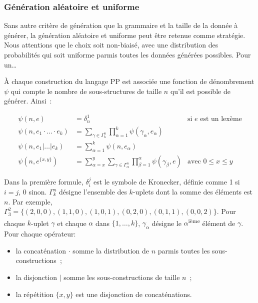 \subsubsection{Génération aléatoire et uniforme}
\label{subsection:data:random_uniform_generation}

Sans autre critère de génération que la grammaire et la taille de la donnée à
générer, la génération aléatoire et uniforme peut être retenue comme stratégie.
Nous attentions que le choix soit non-biaisé, avec une distribution des
probabilités qui soit uniforme parmis toutes les données générées possibles.
Pour un…

À chaque construction du langage PP est associée une fonction de dénombrement
$\psi$ qui compte le nombre de sous-structures de taille $n$ qu'il est possible
de générer. Ainsi~:

\begin{align*}
%
\psi(n, e) & =
    \delta_n^1
    &
    \text{si $e$ est un lexème}
    \\
%
\psi(n, e_1 \cdot \dotso \cdot e_k) & =
    \sum_{\gamma \in \Gamma_k^n}
    \prod_{\alpha = 1}^k
    \psi(\gamma_\alpha, e_\alpha)
    \\
%
\psi(n, e_1 \vert \dots \vert e_k) & =
    \sum_{\alpha = 1}^k
    \psi(n, e_\alpha)
    \\
%
\psi(n, e^{\{x, y\}}) & =
    \sum_{\alpha = x}^y
    \sum_{\gamma \in \Gamma_\alpha^n}
    \prod_{\beta = 1}^\alpha
    \psi(\gamma_\beta, e)
    &
    \text{avec $0 \leq x \leq y$}
%
\end{align*}

Dans la première formule, $\delta_i^j$ est le symbole de Kronecker, définie
comme 1 si $i = j$, 0 sinon. $\Gamma_k^n$ désigne l'ensemble des $k$-uplets dont
la somme des éléments est $n$. Par exemple, $\Gamma_3^2 = \{(2, 0, 0), (1, 1,
0), (1, 0, 1), (0, 2, 0), (0, 1, 1), (0, 0, 2)\}$. Pour chaque $k$-uplet
$\gamma$ et chaque $\alpha$ dans $\{1, \dotso, k\}$, $\gamma_\alpha$ désigne le
$\alpha$\textsuperscript{ième} élément de $\gamma$. Pour chaque opérateur:

\begin{itemize}

\item la concaténation $\cdot$ somme la distribution de $n$ parmis toutes les
sous-constructions~;

\item la disjonction $\vert$ somme les sous-constructions de taille $n$~;

\item la répétition $\{x, y\}$ est une disjonction de concaténations.

\end{itemize}

